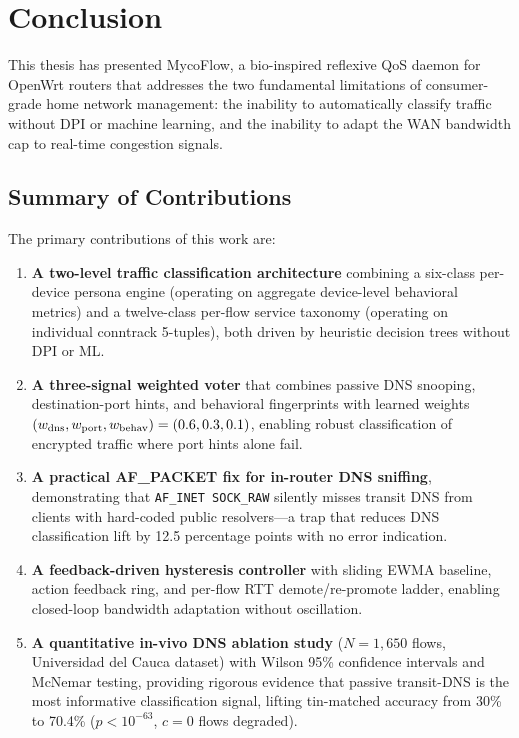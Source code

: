 
\chapter{Conclusion}\label{chapter:conclusion}

This thesis has presented MycoFlow, a bio-inspired reflexive QoS daemon for OpenWrt routers that addresses the two fundamental limitations of consumer-grade home network management: the inability to automatically classify traffic without DPI or machine learning, and the inability to adapt the WAN bandwidth cap to real-time congestion signals.

\section{Summary of Contributions}

The primary contributions of this work are:

\begin{enumerate}
  \item \textbf{A two-level traffic classification architecture} combining a six-class per-device persona engine (operating on aggregate device-level behavioral metrics) and a twelve-class per-flow service taxonomy (operating on individual conntrack 5-tuples), both driven by heuristic decision trees without DPI or ML.

  \item \textbf{A three-signal weighted voter} that combines passive DNS snooping, destination-port hints, and behavioral fingerprints with learned weights $(w_{\rm dns}, w_{\rm port}, w_{\rm behav}) = (0.6, 0.3, 0.1)$, enabling robust classification of encrypted traffic where port hints alone fail.

  \item \textbf{A practical AF\_PACKET fix for in-router DNS sniffing}, demonstrating that \texttt{AF\_INET SOCK\_RAW} silently misses transit DNS from clients with hard-coded public resolvers---a trap that reduces DNS classification lift by 12.5 percentage points with no error indication.

  \item \textbf{A feedback-driven hysteresis controller} with sliding EWMA baseline, action feedback ring, and per-flow RTT demote/re-promote ladder, enabling closed-loop bandwidth adaptation without oscillation.

  \item \textbf{A quantitative in-vivo DNS ablation study} ($N=1{,}650$ flows, Universidad del Cauca dataset) with Wilson 95\% confidence intervals and McNemar testing, providing rigorous evidence that passive transit-DNS is the most informative classification signal, lifting tin-matched accuracy from 30\% to 70.4\% ($p < 10^{-63}$, $c=0$ flows degraded).
\end{enumerate}

